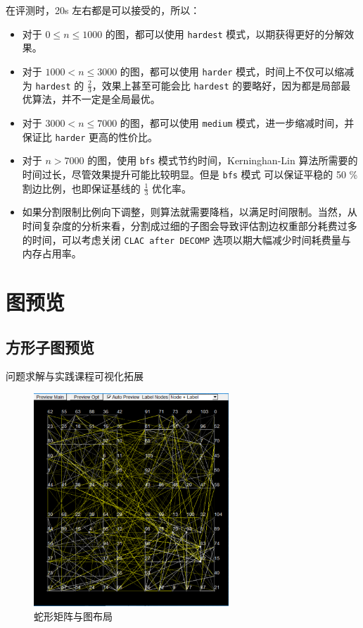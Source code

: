 \documentclass[a4paper,12pt]{article}
\begin{document}
\begin{CJK}{UTF8}{song}
在评测时，20s 左右都是可以接受的，所以：
\begin{itemize}
    \item 对于 $0\leq n\leq 1000$ 的图，都可以使用 \texttt{hardest} 模式，以期获得更好的分解效果。
    \item 对于 $1000 < n\leq 3000$ 的图，都可以使用 \texttt{harder} 模式，时间上不仅可以缩减为 \texttt{hardest} 的 $\frac{2}{3}$，效果上甚至可能会比 \texttt{hardest} 的要略好，因为都是局部最优算法，并不一定是全局最优。
    \item 对于 $3000 < n \leq 7000$ 的图，都可以使用 \texttt{medium} 模式，进一步缩减时间，并保证比 \texttt{harder} 更高的性价比。
    \item 对于 $n > 7000$ 的图，使用 \texttt{bfs} 模式节约时间，Kerninghan-Lin 算法所需要的时间过长，尽管效果提升可能比较明显。但是 \texttt{bfs} 模式 可以保证平稳的 50 \% 割边比例，也即保证基线的 $\frac{1}{3}$ 优化率。
    \item 如果分割限制比例向下调整，则算法就需要降档，以满足时间限制。当然，从时间复杂度的分析来看，分割成过细的子图会导致评估割边权重部分耗费过多的时间，可以考虑关闭 \texttt{CLAC after DECOMP} 选项以期大幅减少时间耗费量与内存占用率。
\end{itemize}

\section{图预览}

\subsection{方形子图预览}
\begin{CJK}{UTF8}{kai}
  问题求解与实践课程可视化拓展
\end{CJK}

\begin{figure}[H]
  \centering
  
  \includegraphics[height=8cm]{snake.png}
  \caption{蛇形矩阵与图布局}
\end{figure}



\end{CJK}
\end{document}
